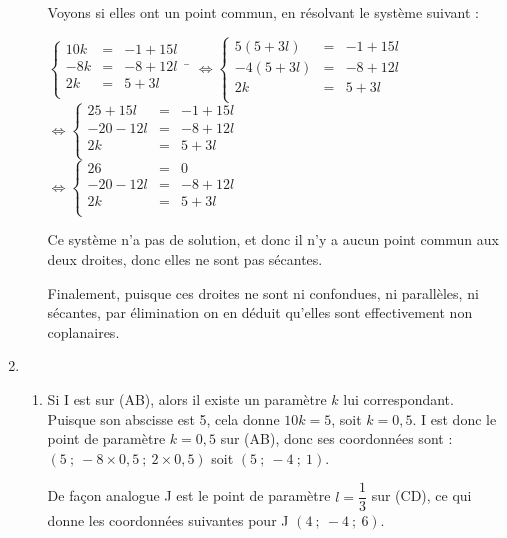 \documentclass[10pt]{article}
\begin{document}
\begin{enumerate}
\begin{enumerate}
Voyons si elles ont un point commun, en résolvant le système suivant :
\begin{tabbing}
$\left\{\begin{array}{lcr} 10k &=& -1 + 15l \\ -8k &=& -8 + 12l \\ 2k &= &5 + 3l\\
\end{array}\right.$~\=
$\iff \left\{\begin{array}{lcr} 5(5 + 3l) &=& -1 + 15l \\ -4(5 + 3l) &=& -8 + 12l \\ 2k &=&  5 + 3l\\
\end{array}\right.$\\
\>$\iff \left\{\begin{array}{lcr} 25 + 15l &=& -1 + 15l \\ -20 -12l &=& -8 + 12l \\ 2k &=&  5 + 3l\\
\end{array}\right.$\\
\>$\iff \left\{\begin{array}{lcr} 26 &=& 0 \\ -20 -12l &=& -8 + 12l \\ 2k &=&  5 + 3l\\
\end{array}\right.$
\end{tabbing}
	
Ce système n'a pas de solution, et donc il n'y a aucun point commun aux deux droites, donc elles ne sont pas sécantes.
	
Finalement, puisque ces droites ne sont ni confondues, ni parallèles, ni sécantes, par élimination on en déduit qu'elles sont effectivement non coplanaires.
		\end{enumerate}
	
	\item \begin{enumerate}
		\item Si I est sur (AB), alors il existe un paramètre $k$ lui correspondant. Puisque son abscisse est 5, cela donne $10 k = 5$, soit $k = 0,5$. I est donc le point de paramètre $k = 0,5$ sur (AB), donc ses coordonnées sont : $(5 ~;~-8\times 0,5~;~2\times 0,5)$ soit $(5~;~-4~;~1)$.
		
De façon analogue J est le point de paramètre $l = \dfrac{1}{3}$ sur (CD), ce qui donne les coordonnées suivantes pour J $(4~;~-4~;~6)$.
		

\end{enumerate}
\end{enumerate}
\end{document}

